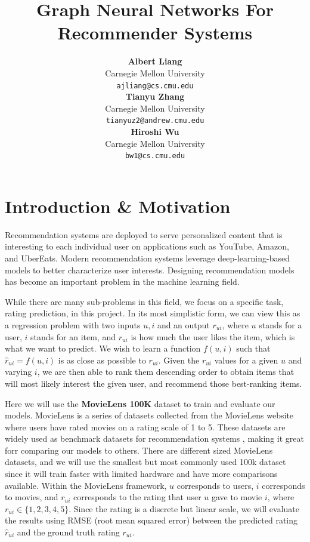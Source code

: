 \documentclass{article}
\title{Graph Neural Networks For Recommender Systems}
\author{
  \textbf{Albert Liang}  \\
  Carnegie Mellon University \\
  \texttt{ajliang@cs.cmu.edu} \\
  \And
  \textbf{Tianyu Zhang} \\
  Carnegie Mellon University \\
  \texttt{tianyuz2@andrew.cmu.edu} \\
  \And
  \textbf{Hiroshi Wu} \\
  Carnegie Mellon University \\
  \texttt{bw1@cs.cmu.edu} \\
}
\begin{document}
\maketitle



\section{Introduction \& Motivation}

Recommendation systems are deployed to serve personalized content that is interesting to each individual user on applications such as YouTube, Amazon, and UberEats. Modern recommendation systems leverage deep-learning-based models to better characterize user interests. Designing recommendation models has become an important problem in the machine learning field.

While there are many sub-problems in this field, we focus on a specific task, rating prediction, in this project. In its most simplistic form, we can view this as a regression problem with two inputs $u,i$ and an output $r_{ui}$, where $u$ stands for a user, $i$ stands for an item, and $r_{ui}$ is how much the user likes the item, which is what we want to predict. We wish to learn a function $f(u,i)$ such that $\hat{r}_{ui}=f(u,i)$ is as close as possible to $r_{ui}$. Given the $r_{ui}$ values for a given $u$ and varying $i$, we are then able to rank them descending order to obtain items that will most likely interest the given user, and recommend those best-ranking items.

Here we will use the \textbf{MovieLens 100K} \cite{movielens} dataset to train and evaluate our models. MovieLens is a series of datasets collected from the MovieLens website where users have rated movies on a rating scale of 1 to 5. These datasets are widely used as benchmark datasets for recommendation systems \cite{DBLP:journals/corr/abs-2011-02260}, making it great forr comparing our models to others. There are different sized MovieLens datasets, and we will use the smallest but most commonly used 100k dataset since it will train faster with limited hardware and have more comparisons available. Within the MovieLens framework, $u$ corresponds to users, $i$ corresponds to movies, and $r_{ui}$ corresponds to the rating that user $u$ gave to movie $i$, where $r_{ui}\in\{1,2,3,4,5\}$. Since the rating is a discrete but linear scale, we will evaluate the results using RMSE (root mean squared error) between the predicted rating $\hat{r}_{ui}$ and the ground truth rating $r_{ui}$.
\end{document}
